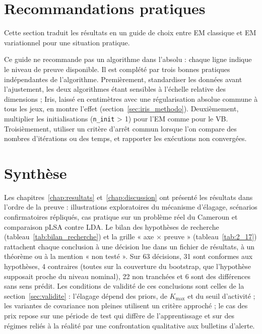 \section{Recommandations pratiques}\label{sec:recommandations}
Cette section traduit les résultats en un guide de choix entre EM classique et EM variationnel pour une situation pratique.

Ce guide ne recommande pas un algorithme dans l'absolu : chaque ligne indique le niveau de preuve disponible. Il est complété par trois bonnes pratiques indépendantes de l'algorithme. Premièrement, standardiser les données avant l'ajustement, les deux algorithmes étant sensibles à l'échelle relative des dimensions ; Iris, laissé en centimètres avec une régularisation absolue commune à tous les jeux, en montre l'effet (section~\ref{sec:iris_methodo}). Deuxièmement, multiplier les initialisations (\texttt{n\_init} > 1) pour l'EM comme pour le VB. Troisièmement, utiliser un critère d'arrêt commun lorsque l'on compare des nombres d'itérations ou des temps, et rapporter les exécutions non convergées.

\section{Synthèse}\label{sec:conclusion_du_chapitre_3}
\enlargethispage{2\baselineskip}%
Les chapitres~\ref{chap:resultats} et~\ref{chap:discussion} ont présenté les résultats dans l'ordre de la preuve : illustrations exploratoires du mécanisme d'élagage, scénarios confirmatoires répliqués, cas pratique sur un problème réel du Cameroun et comparaison pLSA contre LDA. Le bilan des hypothèses de recherche (tableau~\ref{tab:bilan_recherche}) et la grille « axe $\times$ preuve » (tableau~\ref{tab:2_17}) rattachent chaque conclusion à une décision lue dans un fichier de résultats, à un théorème ou à la mention « non testé ». Sur 63 décisions, 31 sont conformes aux hypothèses, 4 contraires (toutes sur la couverture du bootstrap, que l'hypothèse supposait proche du niveau nominal), 22 non tranchées et 6 sont des différences sans sens prédit. Les conditions de validité de ces conclusions sont celles de la section~\ref{sec:validite} : l'élagage dépend des priors, de $K_{\max}$ et du seuil d'activité ; les variantes de covariance non pleines utilisent un critère approché ; le cas des prix repose sur une période de test qui diffère de l'apprentissage et sur des régimes reliés à la réalité par une confrontation qualitative aux bulletins d'alerte.

